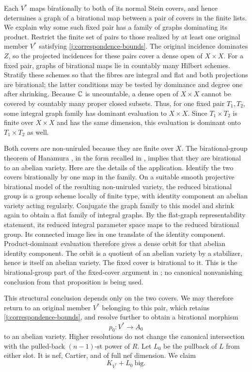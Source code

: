 Each $V^*$ maps birationally to both of its normal Stein covers,
and hence determines a graph of a birational map between a pair
of covers in the finite lists. We explain why some such fixed pair
has a family of graphs dominating its product. Restrict the finite
set of pairs to those realized by at least one original member
$V^*$ satisfying \eqref{j:correspondence-bounds}. The original
incidence dominates $Z$, so the projected incidences for these
pairs cover a dense open of $X\times X$. For a fixed pair, graphs of
birational maps lie in countably many Hilbert schemes. Stratify
these schemes so that the fibres are integral and flat and both
projections are birational; the latter conditions may be tested
by dominance and degree one after shrinking. Because $\mathbb C$ is
uncountable, a dense open of $X\times X$ cannot be covered by
countably many proper closed subsets. Thus, for one fixed pair
$T_1,T_2$, some integral graph family has dominant evaluation to
$X\times X$. Since $T_1\times T_2$ is finite over $X\times X$
and has the same dimension, this evaluation is dominant onto
$T_1\times T_2$ as well.

Both covers are non-uniruled because they are finite over $X$.
The birational-group theorem of Hanamura
\cite[Theorems~2.1--2.2]{Hanamura}, in the form recalled in
\cite[Proposition~3.7 and Theorems~3.8--3.9]{Blanc}, implies that
they are birational to an abelian variety. Here are the details
of the application. Identify the two covers birationally by one
map in the family. On a suitable smooth projective birational
model of the resulting non-uniruled variety, the reduced
birational group is a group scheme locally of finite type, with
identity component an abelian variety acting regularly. Conjugate
the graph family to this model and shrink again to obtain a flat
family of integral graphs. By the flat-graph representability
statement, its reduced integral parameter space maps to the
reduced birational group. Its connected image lies in one
translate of the identity component. Product-dominant evaluation
therefore gives a dense orbit for that abelian identity component.
The orbit is a quotient of an abelian variety by a stabilizer,
hence is itself an abelian variety. The fixed cover is birational
to it. This is the birational-group part of the fixed-cover
argument in \cite[Proposition~6.11]{LA}; no canonical
nonvanishing conclusion from that proposition is being used.

This structural conclusion depends only on the two covers. We may
therefore return to an original member $V^*$ belonging to this pair,
which retains \eqref{j:correspondence-bounds}, and resolve
further to obtain a birational morphism
\[
                         p_0:V^*\longrightarrow A_0
\]
to an abelian variety. Higher resolutions do not change the
canonical intersection with the pulled-back $(n-1)$-st power of
$R$. Let $L_0$ be the pullback of $L$ from either slot. It is nef,
Cartier, and of full nef dimension. We claim
\begin{equation}\label{j:abelian-big}
                         K_{V^*}+L_0\ \text{big}.
\end{equation}

